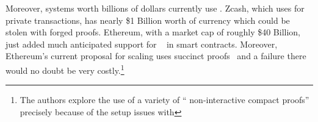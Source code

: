 \documentclass{article}
\begin{document}
Moreover, systems worth billions of dollars currently use {\snarks}. Zcash, which uses {\snarks} for private transactions, has nearly  \$1 Billion  worth of currency which could be stolen with forged proofs. Ethereum, with a market cap of roughly \$40 Billion, just added  much anticipated support for {\snarks}~\cite{ethereumsnarks} in smart contracts. Moreover, Ethereum's current proposal for scaling uses succinct proofs~\cite{ethplasma} and a failure there would no doubt be very costly.\footnote{The authors explore the use of a  variety of `` non-interactive compact proofs'' precisely because of the setup issues with {\snarks}} 




\end{document}
